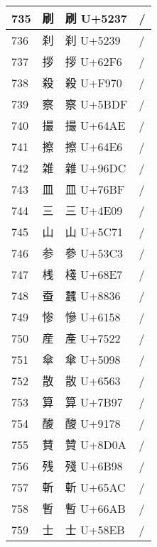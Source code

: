 \documentclass[uplatex,12pt]{jsarticle}
\begin{document}
\begin{longtable}[c]{llp{3cm}l}
  735 & {\huge 刷} &
    {\huge 刷} U+5237 &
      /  \\ \hline
  736 & {\huge 刹} &
    {\huge 刹} U+5239 &
      /  \\ \hline
  737 & {\huge 拶} &
    {\huge 拶} U+62F6 &
      /  \\ \hline
  738 & {\huge 殺} &
    {\huge 殺} U+F970 &
      /  \\ \hline
  739 & {\huge 察} &
    {\huge 察} U+5BDF &
      /  \\ \hline
  740 & {\huge 撮} &
    {\huge 撮} U+64AE &
      /  \\ \hline
  741 & {\huge 擦} &
    {\huge 擦} U+64E6 &
      /  \\ \hline
  742 & {\huge 雑} &
    {\huge 雜} U+96DC &
      /  \\ \hline
  743 & {\huge 皿} &
    {\huge 皿} U+76BF &
      /  \\ \hline
  744 & {\huge 三} &
    {\huge 三} U+4E09 &
      /  \\ \hline
  745 & {\huge 山} &
    {\huge 山} U+5C71 &
      /  \\ \hline
  746 & {\huge 参} &
    {\huge 參} U+53C3 &
      /  \\ \hline
  747 & {\huge 桟} &
    {\huge 棧} U+68E7 &
      /  \\ \hline
  748 & {\huge 蚕} &
    {\huge 蠶} U+8836 &
      /  \\ \hline
  749 & {\huge 惨} &
    {\huge 慘} U+6158 &
      /  \\ \hline
  750 & {\huge 産} &
    {\huge 產} U+7522 &
      /  \\ \hline
  751 & {\huge 傘} &
    {\huge 傘} U+5098 &
      /  \\ \hline
  752 & {\huge 散} &
    {\huge 散} U+6563 &
      /  \\ \hline
  753 & {\huge 算} &
    {\huge 算} U+7B97 &
      /  \\ \hline
  754 & {\huge 酸} &
    {\huge 酸} U+9178 &
      /  \\ \hline
  755 & {\huge 賛} &
    {\huge 贊} U+8D0A &
      /  \\ \hline
  756 & {\huge 残} &
    {\huge 殘} U+6B98 &
      /  \\ \hline
  757 & {\huge 斬} &
    {\huge 斬} U+65AC &
      /  \\ \hline
  758 & {\huge 暫} &
    {\huge 暫} U+66AB &
      /  \\ \hline
  759 & {\huge 士} &
    {\huge 士} U+58EB &
      /  \\ \hline

\end{longtable}
\end{document}

